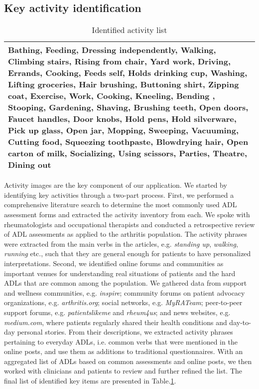 \documentclass{sig-alternate-05-2015}
\begin{document}
\subsection{Key activity identification}
\begin{table}[]
\centering

\label{my-label}
\begin{tabular}{|p{8cm}|}
\hline
Bathing, Feeding, Dressing independently, Walking, Climbing stairs, Rising from chair, Yard work, Driving, Errands, Cooking, Feeds self, Holds drinking cup, Washing, Lifting groceries, Hair brushing, Buttoning shirt, Zipping coat, Exercise, Work, Cooking, Kneeling, Bending , Stooping, Gardening, Shaving, Brushing teeth, Open doors, Faucet handles, Door knobs, Hold pens, Hold silverware, Pick up glass, Open jar, Mopping, Sweeping, Vacuuming, Cutting food, Squeezing toothpaste, Blowdrying hair, Open carton of milk, Socializing, Using scissors, Parties, Theatre, Dining out \\ \hline
\end{tabular}
\caption{Identified activity list}
\vspace{-3mm}
\label{tbl:list}
\end{table}

Activity images are the key component of our application. We started by identifying key activities through a two-part process. First, we performed a comprehensive literature search to determine the most commonly used ADL assessment forms and extracted the activity inventory from each. We spoke with rheumatologists and occupational therapists and conducted a retrospective review of ADL assessments as applied to the arthritis population. The activity phrases were extracted from the main verbs in the articles, e.g. \textit{standing up}, \textit{walking}, \textit{running} etc., such that they are general enough for patients to have personalized interpretations. Second, we identified online forums and communities as important venues for understanding real situations of patients and the hard ADLs that are common among the population. We gathered data from  support and wellness communities, e.g. \textit{inspire}; community forums on patient advocacy organizations, e.g. \textit{arthritis.org}; social networks, e.g. \textit{MyRATeam}; peer-to-peer support forums, e.g. \textit{patientslikeme} and \textit{rheum4us}; and news websites, e.g. \textit{medium.com}, where patients regularly shared their health conditions and day-to-day personal stories. From their descriptions, we extracted activity phrases pertaining to everyday ADLs, i.e. common verbs that were mentioned in the online posts, and use them as additions to traditional questionnaires. With an aggregated list of ADLs based on common assessments and online posts, we then worked with clinicians and patients to review and further refined the list. The final list of identified key items are presented in Table.\ref{tbl:list}.
\end{document}
